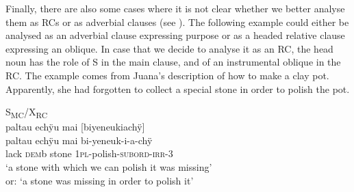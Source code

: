 %


Finally, there are also some cases where it is not clear whether we better analyse them as RCs or as adverbial clauses (see ). The following example could either be analysed as an adverbial clause expressing purpose or as a headed relative clause expressing an oblique. In case that we decide to analyse it as an RC, the head noun has the role of S in the main clause, and of an instrumental oblique in the RC. The example comes from Juana’s description of how to make a clay pot. Apparently, she had forgotten to collect a special stone in order to polish the pot.

\ea\label{ex:stone-lack}
\begingl
\glpreamble  \textup{S\textsubscript{MC}/X\textsubscript{RC}}\\paltau echÿu mai \textup{[}biyeneukiachÿ\textup{]}\\
\gla paltau echÿu mai bi-yeneuk-i-a-chÿ\\
\glb lack \textsc{dem}b stone 1\textsc{pl}-polish-\textsc{subord}-\textsc{irr}-3\\
\glft ‘a stone with which we can polish it was missing’\\ or: ‘a stone was missing in order to polish it’
\endgl
\trailingcitation{[jxx-d110923l-1.08-09]}
\xe


